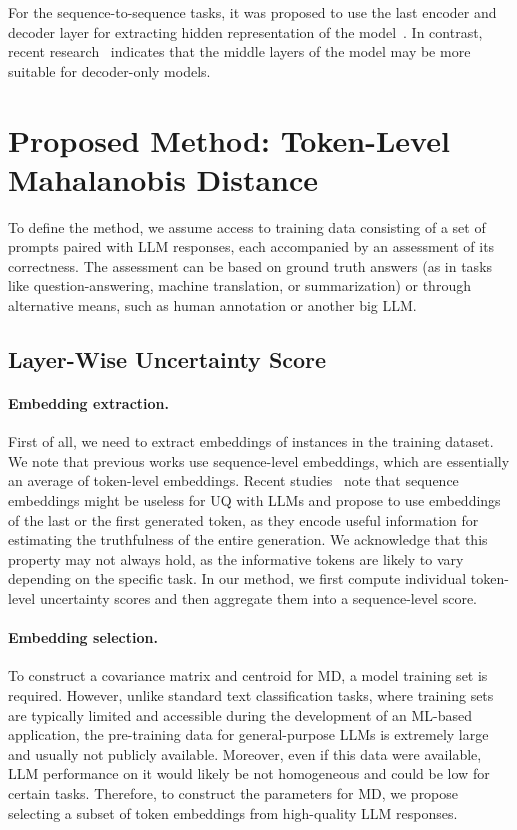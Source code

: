 \documentclass[11pt]{article}
\begin{document}
  For the sequence-to-sequence tasks, it was proposed to use the last encoder and decoder layer for extracting hidden representation of the model~\cite{vazhentsev-etal-2023-efficient,ren2023outofdistribution}. In contrast, recent research~\cite{azaria-mitchell-2023-internal,chen2024eigenscore} indicates that the middle layers of the model may be more suitable for decoder-only models. 

\section{Proposed Method: Token-Level Mahalanobis Distance}

  To define the method, we assume access to training data consisting of a set of prompts paired with LLM responses, each accompanied by an assessment of its correctness. The assessment can be based on ground truth answers (as in tasks like question-answering, machine translation, or summarization) or through alternative means, such as human annotation or another big LLM.

\subsection{Layer-Wise Uncertainty Score}

\paragraph{Embedding extraction.}
  First of all, we need to extract embeddings of instances in the training dataset. We note that previous works use sequence-level embeddings, which are essentially an average of token-level embeddings. Recent studies~\cite{azaria-mitchell-2023-internal,chen2024eigenscore} note that sequence embeddings might be useless for UQ with LLMs and propose to use embeddings of the last or the first generated token, as they encode useful information for estimating the truthfulness of the entire generation. We acknowledge that this property may not always hold, as the informative tokens are likely to vary depending on the specific task. In our method, we first compute individual token-level uncertainty scores and then aggregate them into a sequence-level score. 

\paragraph{Embedding selection.}
  To construct a covariance matrix and centroid for MD, a model training set is required. 
  However, unlike standard text classification tasks, where training sets are typically limited and accessible during the development of an ML-based application, the pre-training data for general-purpose LLMs is extremely large and usually not publicly available. Moreover, even if this data were available, LLM performance on it would likely be not homogeneous and could be low for certain tasks. Therefore, to construct the parameters for MD, we propose selecting a subset of token embeddings from high-quality LLM responses. 
\end{document}
